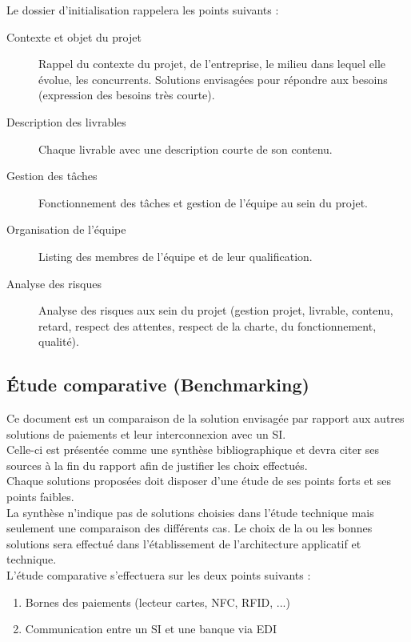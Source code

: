 Le dossier d'initialisation rappelera les points suivants :
\begin{description}
  \item[Contexte et objet du projet] Rappel du contexte du projet, de
    l'entreprise, le milieu dans lequel elle évolue, les concurrents.
    Solutions envisagées pour répondre aux besoins (expression des besoins
    très courte).
  \item[Description des livrables] Chaque livrable avec une description courte
    de son contenu.
  \item[Gestion des tâches] Fonctionnement des tâches et gestion de l'équipe au
    sein du projet.
  \item[Organisation de l'équipe] Listing des membres de l'équipe et de leur
    qualification.
  \item[Analyse des risques] Analyse des risques aux sein du projet (gestion
    projet, livrable, contenu, retard, respect des attentes, respect de
    la charte, du fonctionnement, qualité).
\end{description}

\subsection{Étude comparative (Benchmarking)}
Ce document est un comparaison de la solution envisagée par rapport aux autres
solutions de paiements et leur interconnexion avec un SI. \\

Celle-ci est présentée comme une synthèse bibliographique et devra citer ses
sources à la fin du rapport afin de justifier les choix effectués. \\

Chaque solutions proposées doit disposer d'une étude de ses points forts et ses
points faibles. \\

La synthèse n'indique pas de solutions choisies dans l'étude technique mais
seulement une comparaison des différents cas. Le choix de la ou les bonnes
solutions sera effectué dans l'établissement de l'architecture applicatif et
technique. \\

L'étude comparative s'effectuera sur les deux points suivants :
\begin{enumerate}
  \item Bornes des paiements (lecteur cartes, NFC, RFID, ...)
  \item Communication entre un SI et une banque via EDI
\end{enumerate}

